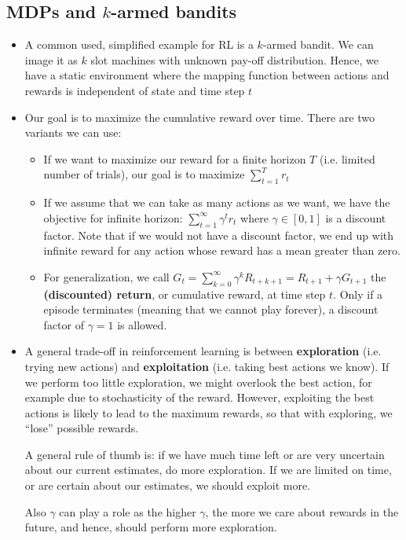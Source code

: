 \subsection{MDPs and $k$-armed bandits}
\begin{itemize}
	\item A common used, simplified example for RL is a $k$-armed bandit. We can image it as $k$ slot machines with unknown pay-off distribution. Hence, we have a static environment where the mapping function between actions and rewards is independent of state and time step $t$
	\item Our goal is to maximize the cumulative reward over time. There are two variants we can use:
	\begin{itemize}
		\item If we want to maximize our reward for a finite horizon $T$ (i.e. limited number of trials), our goal is to maximize $\sum_{t=1}^{T} r_t$
		\item If we assume that we can take as many actions as we want, we have the objective for infinite horizon: $\sum_{t=1}^{\infty} \gamma^{t}r_t$ where $\gamma\in [0,1]$ is a discount factor. Note that if we would not have a discount factor, we end up with infinite reward for any action whose reward has a mean greater than zero.
		\item For generalization, we call $G_t=\sum_{k=0}^{\infty} \gamma^{k}R_{t+k+1}=R_{t+1}+\gamma G_{t+1}$ the \textbf{(discounted) return}, or cumulative reward, at time step $t$. Only if a episode terminates (meaning that we cannot play forever), a discount factor of $\gamma=1$ is allowed.
	\end{itemize} 
	\item A general trade-off in reinforcement learning is between \textbf{exploration} (i.e. trying new actions) and \textbf{exploitation} (i.e. taking best actions we know). If we perform too little exploration, we might overlook the best action, for example due to stochasticity of the reward. However, exploiting the best actions is likely to lead to the maximum rewards, so that with exploring, we ``lose'' possible rewards.
	
	A general rule of thumb is: if we have much time left or are very uncertain about our current estimates, do more exploration. If we are limited on time, or are certain about our estimates, we should exploit more. 
	
	Also $\gamma$ can play a role as the higher $\gamma$, the more we care about rewards in the future, and hence, should perform more exploration.
	

\end{itemize}
